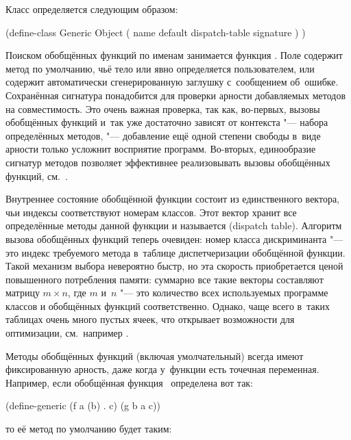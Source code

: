 Класс  определяется следующим образом:

\begin{code:lisp}
(define-class Generic Object
  ( name default dispatch-table signature ) )
\end{code:lisp}

Поиском обобщённых функций по именам занимается функция . Поле
 содержит метод по умолчанию, чьё тело или явно определяется
пользователем, или содержит автоматически сгенерированную заглушку с~сообщением
об~ошибке. Сохранённая сигнатура понадобится для проверки арности добавляемых
методов на совместимость. Это очень важная проверка, так как, во-первых, вызовы
обобщённых функций и~так уже достаточно зависят от контекста "--- набора
определённых методов, "--- добавление ещё одной степени свободы в~виде арности
только усложнит восприятие программ. Во-вторых, единообразие сигнатур методов
позволяет эффективнее реализовывать вызовы обобщённых функций, см.~\cite{kr90}.

Внутреннее состояние обобщённой функции состоит из единственного вектора, чьи
индексы соответствуют номерам классов. Этот вектор хранит все определённые
методы данной функции и называется  (dispatch
table). Алгоритм вызова обобщённых функций теперь очевиден: номер класса
дискриминанта "--- это индекс требуемого метода в~таблице диспетчеризации
обобщённой функции. Такой механизм выбора невероятно быстр, но эта скорость
приобретается ценой повышенного потребления памяти: суммарно все такие векторы
составляют матрицу $m \times n$, где $m$ и~$n$ "--- это количество всех
используемых программе классов и обобщённых функций соответственно. Однако, чаще
всего в~таких таблицах очень много пустых ячеек, что открывает возможности для
оптимизации, см.~например \cite{vh94,que93b}.

Методы обобщённых функций (включая умолчательный) всегда имеют фиксированную
арность, даже когда у~функции есть точечная переменная. Например, если
обобщённая функция~ определена вот так:

\begin{code:lisp}
(define-generic (f a (b) . c) (g b a c))
\end{code:lisp}

\noindent
то её метод по умолчанию будет таким:

